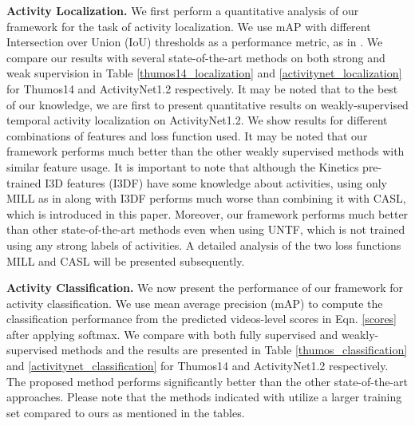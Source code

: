 \documentclass[runningheads]{llncs}
\begin{document}
\textbf{Activity Localization.} We first perform a quantitative analysis of our framework for the task of activity localization. We use mAP with different Intersection over Union (IoU) thresholds as a performance metric, as in \cite{idrees2017thumos}. We compare our results with several state-of-the-art methods on both strong and weak supervision in Table \ref{thumos14_localization} and \ref{activitynet_localization} for Thumos14 and ActivityNet1.2 respectively. It may be noted that to the best of our knowledge, we are first to present quantitative results on weakly-supervised temporal activity localization on ActivityNet1.2. We show results for different combinations of features and loss function used. It may be noted that our framework performs much better than the other weakly supervised methods with similar feature usage. It is important to note that although the Kinetics pre-trained I3D features (I3DF) have some knowledge about activities, using only MILL as in \cite{wang2017untrimmednets} along with I3DF performs much worse than combining it with CASL, which is introduced in this paper. Moreover, our framework performs much better than other state-of-the-art methods even when using UNTF, which is not trained using any strong labels of activities. A detailed analysis of the two loss functions MILL and CASL will be presented subsequently.  

\textbf{Activity Classification.}
We now present the performance of our framework for activity classification. We use mean average precision (mAP) to compute the classification performance from the predicted videos-level scores in Eqn. \ref{scores} after applying softmax. We compare with both fully supervised and weakly-supervised methods and the results are presented in Table \ref{thumos_classification} and \ref{activitynet_classification} for Thumos14 and ActivityNet1.2 respectively. The proposed method performs significantly better than the other state-of-the-art approaches. Please note that the methods indicated with  utilize a larger training set compared to ours as mentioned in the tables. 
\end{document}
